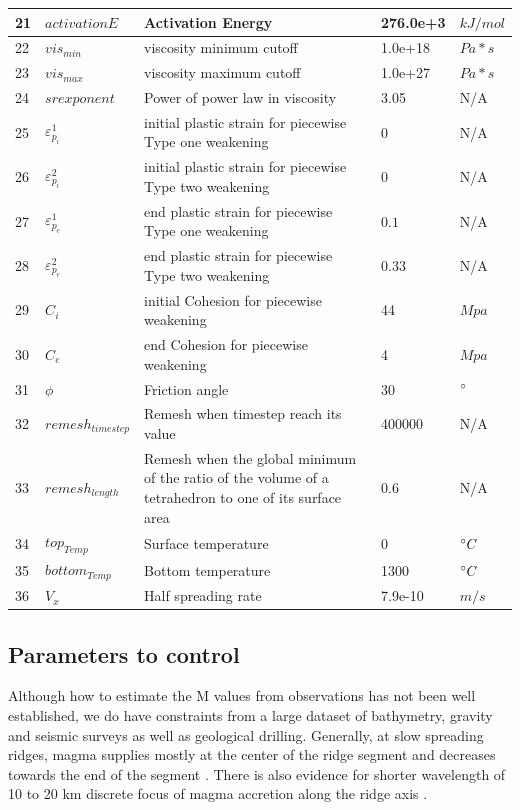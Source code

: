 \begin{table}[h]
\begin{tabular}[h]{l l p{6.8cm} l l}
\hline
21   &  $activationE$    &    Activation Energy      & 276.0e+3   & $kJ/mol$  \\
\hline
22   &  $vis_{min}$    &    viscosity minimum cutoff      & 1.0e+18   & $Pa*s$  \\
\hline
23   &  $vis_{max}$    &    viscosity maximum cutoff      & 1.0e+27   & $Pa*s$  \\
\hline
24   &  $srexponent$    &    Power of power law in viscosity       & 3.05   & N/A  \\
\hline
25   &  $\varepsilon_{p_{i}}^{1}$    &    initial plastic strain for piecewise Type one weakening       & $0$   & N/A  \\
\hline
26   &  $\varepsilon_{p_{i}}^{2}$    &    initial plastic strain for piecewise Type two weakening       & $0$   & N/A  \\
\hline
27   &  $\varepsilon_{p_{e}}^{1}$    &    end plastic strain for piecewise Type one weakening       & $0.1$   & N/A  \\
\hline
28   &  $\varepsilon_{p_{e}}^{2}$    &    end plastic strain for piecewise Type two weakening       & $0.33$   & N/A  \\
\hline
29   &  $C_{i}$    &    initial Cohesion for piecewise weakening       & 44   & $Mpa$  \\
\hline
30   &  $C_{e}$    &    end Cohesion for piecewise weakening       & 4   & $Mpa$  \\
\hline
31   &  $\phi$    &    Friction angle      & 30   & $\degree$  \\
\hline
32   &  $remesh_{timestep}$    &    Remesh when timestep reach its value      & 400000   & N/A  \\
\hline
33   &  $remesh_{length}$    &    Remesh when the global minimum of the ratio of the volume of a tetrahedron to one of its surface area      & 0.6   & N/A  \\
\hline
34   &  $top_{Temp}$    &    Surface temperature      & 0   & $\degree C$  \\
\hline
35   &  $bottom_{Temp}$    &    Bottom temperature      & 1300   & $\degree C$  \\
\hline
36   &  $V_{x}$    &    Half spreading rate      & 7.9e-10   & $m/s$  \\

\hline
\hline
\end{tabular}

\label{Tab_ModelParameters}
\end{table}

\subsection{Parameters to control}
Although how to estimate the M values from observations has not been well established, we do have constraints from a large dataset of bathymetry, gravity and seismic surveys as well as geological drilling. Generally, at slow spreading ridges, magma supplies mostly at the center of the ridge segment and decreases towards the end of the segment \citep{Tolstoy1993,Chen1999}. There is also evidence for shorter wavelength of 10 to 20 km discrete focus of magma accretion along the ridge axis \citep{Lin1990}. 

